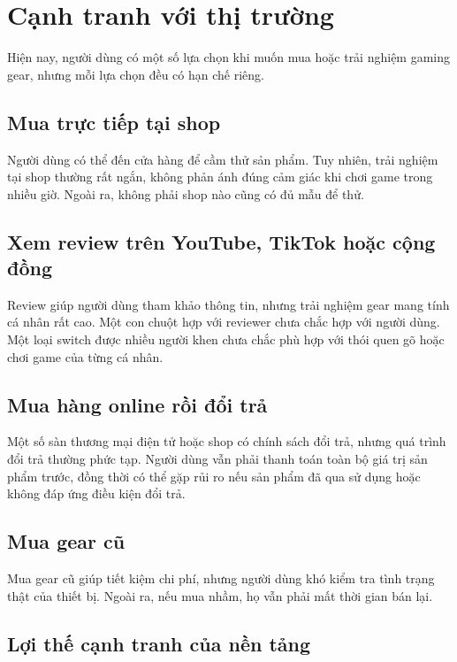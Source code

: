 \section{Cạnh tranh với thị trường}

Hiện nay, người dùng có một số lựa chọn khi muốn mua hoặc trải nghiệm gaming gear, nhưng mỗi lựa chọn đều có hạn chế riêng.

\subsection{Mua trực tiếp tại shop}

Người dùng có thể đến cửa hàng để cầm thử sản phẩm. Tuy nhiên, trải nghiệm tại shop thường rất ngắn, không phản ánh đúng cảm giác khi chơi game trong nhiều giờ. Ngoài ra, không phải shop nào cũng có đủ mẫu để thử.

\subsection{Xem review trên YouTube, TikTok hoặc cộng đồng}

Review giúp người dùng tham khảo thông tin, nhưng trải nghiệm gear mang tính cá nhân rất cao. Một con chuột hợp với reviewer chưa chắc hợp với người dùng. Một loại switch được nhiều người khen chưa chắc phù hợp với thói quen gõ hoặc chơi game của từng cá nhân.

\subsection{Mua hàng online rồi đổi trả}

Một số sàn thương mại điện tử hoặc shop có chính sách đổi trả, nhưng quá trình đổi trả thường phức tạp. Người dùng vẫn phải thanh toán toàn bộ giá trị sản phẩm trước, đồng thời có thể gặp rủi ro nếu sản phẩm đã qua sử dụng hoặc không đáp ứng điều kiện đổi trả.

\subsection{Mua gear cũ}

Mua gear cũ giúp tiết kiệm chi phí, nhưng người dùng khó kiểm tra tình trạng thật của thiết bị. Ngoài ra, nếu mua nhầm, họ vẫn phải mất thời gian bán lại.

\subsection{Lợi thế cạnh tranh của nền tảng}

